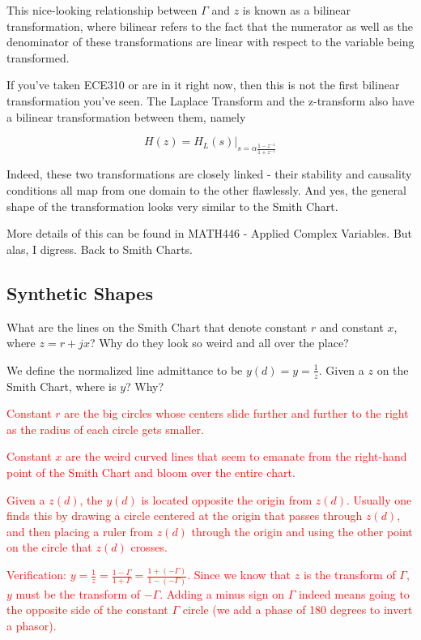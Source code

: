 \documentclass{article}
\begin{document}
This nice-looking relationship between $\Gamma$ and $z$ is known as a bilinear transformation, where bilinear refers to the fact that the numerator as well as the denominator of these transformations are linear with respect to the variable being transformed.

If you've taken ECE310 or are in it right now, then this is not the first bilinear transformation you've seen. The Laplace Transform and the z-transform also have a bilinear transformation between them, namely

$$H(z) = H_L(s) \vert_{s = \alpha \frac{1 - z^{-1}}{1+z^{-1}}}$$

Indeed, these two transformations are closely linked - their stability and causality conditions all map from one domain to the other flawlessly. And yes, the general shape of the transformation looks very similar to the Smith Chart.

More details of this can be found in MATH446 - Applied Complex Variables. But alas, I digress. Back to Smith Charts.

\newpage

\subsection{Synthetic Shapes}

What are the lines on the Smith Chart that denote constant $r$ and constant $x$, where $z = r + jx$? Why do they look so weird and all over the place?

We define the normalized line admittance to be $y(d) = y = \frac{1}{z}$. Given a $z$ on the Smith Chart, where is $y$? Why?

\textcolor{red}{Constant $r$ are the big circles whose centers slide further and further to the right as the radius of each circle gets smaller.}

\textcolor{red}{Constant $x$ are the weird curved lines that seem to emanate from the right-hand point of the Smith Chart and bloom over the entire chart.}

\textcolor{red}{Given a $z(d)$, the $y(d)$ is located opposite the origin from $z(d)$. Usually one finds this by drawing a circle centered at the origin that passes through $z(d)$, and then placing a ruler from $z(d)$ through the origin and using the other point on the circle that $z(d)$ crosses.}

\textcolor{red}{Verification: $y = \frac{1}{z} = \frac{1 - \Gamma}{1 + \Gamma} = \frac{1 + (-\Gamma)}{1 - (-\Gamma)}$. Since we know that $z$ is the transform of $\Gamma$, $y$ must be the transform of $-\Gamma$. Adding a minus sign on $\Gamma$ indeed means going to the opposite side of the constant $\Gamma$ circle (we add a phase of 180 degrees to invert a phasor).}
\end{document}
